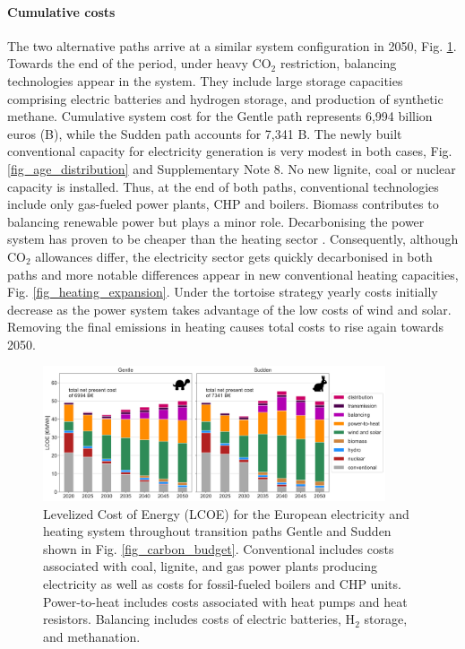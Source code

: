 \documentclass[5p]{elsarticle} %
\begin{document}
\paragraph{\textbf{Cumulative costs}} The two alternative paths arrive at a similar system configuration in 2050, Fig. \ref{fig_system_cost}. Towards the end of the period, under heavy CO$_2$ restriction, balancing technologies appear in the system. They include large storage capacities comprising electric batteries and hydrogen storage, and production of synthetic methane.  Cumulative system cost for the Gentle path represents 6,994 billion euros (B\EUR), while the Sudden path accounts for 7,341 B\EUR. The newly built conventional capacity for electricity generation is very modest in both cases, Fig. \ref{fig_age_distribution} and Supplementary Note 8. No new lignite, coal or nuclear capacity is installed. Thus, at the end of both paths, conventional technologies include only gas-fueled power plants, CHP and boilers. Biomass contributes to balancing renewable power but plays a minor role. Decarbonising the power system has proven to be cheaper than the heating sector \cite{Zhu_2019}. Consequently, although CO$_2$ allowances differ, the electricity sector gets quickly decarbonised in both paths and more notable differences appear in new conventional heating capacities, Fig. \ref{fig_heating_expansion}. Under the tortoise strategy yearly costs initially decrease as the power system takes advantage of the low costs of wind and solar. Removing the final emissions in heating causes total costs to rise again towards 2050.

\begin{figure}[!h]
\centering
\includegraphics[width=0.9\textwidth]{figures/LCOE_Base.png}
\caption{Levelized Cost of Energy (LCOE) for the European electricity and heating system throughout transition paths Gentle and Sudden shown in Fig. \ref{fig_carbon_budget}. Conventional includes costs associated with coal, lignite, and gas power plants producing electricity as well as costs for fossil-fueled boilers and CHP units. Power-to-heat includes costs associated with heat pumps and heat resistors. Balancing includes costs of electric batteries, H$_2$ storage, and methanation.} \label{fig_system_cost} 
\end{figure}
\end{document}
